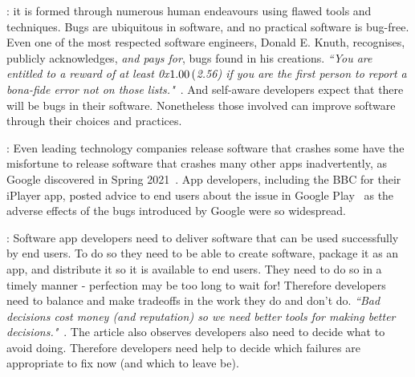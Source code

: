 : it is formed through numerous human endeavours using flawed tools and techniques.
Bugs are ubiquitous in software, and no practical software is bug-free. Even one of the most respected software engineers, Donald E. Knuth, recognises, publicly acknowledges, \emph{and pays for}, bugs found in his creations. %
\emph{``You are entitled to a reward of at least 0x$1.00 \nobreak\hspace{.16667em plus .08333em} ($2.56) if you are the first person to report a \textit{bona-fide} error not on those lists."}~. And self-aware developers expect that there will be bugs in their software. Nonetheless those involved can improve software through their choices and practices.

: Even leading technology companies release software that crashes some have the misfortune to release software that crashes many other apps inadvertently, as Google discovered in Spring 2021~. App developers, including the BBC for their iPlayer app, posted advice to end users about the issue in Google Play~ as the adverse effects of the bugs introduced by Google were so widespread.

: Software app developers need to deliver software that can be used successfully by end users. To do so they need to be able to create software, package it as an app, and distribute it so it is available to end users.
%
They need to do so in a timely manner - perfection may be too long to wait for! Therefore developers need to balance and make tradeoffs in the work they do and don't do. \emph{``Bad decisions cost money (and reputation) so we need better tools for making better decisions."}~. The article also observes developers also need to decide what to avoid doing. Therefore developers need help to decide which failures are appropriate to fix now (and which to leave be).

